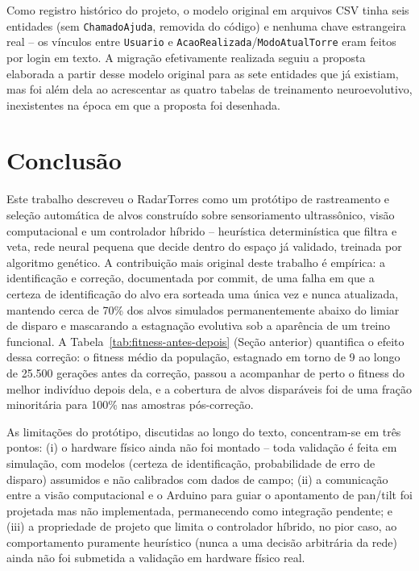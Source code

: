 \documentclass[12pt,a4paper]{article}
\begin{document}
Como registro histórico do projeto, o modelo original em arquivos CSV tinha seis entidades (sem
\texttt{ChamadoAjuda}, removida do código) e nenhuma chave estrangeira real -- os vínculos entre
\texttt{Usuario} e \texttt{AcaoRealizada}/\texttt{ModoAtualTorre} eram feitos por login em texto. A
migração efetivamente realizada seguiu a proposta elaborada a partir desse modelo original para as
sete entidades que já existiam, mas foi além dela ao acrescentar as quatro tabelas de treinamento
neuroevolutivo, inexistentes na época em que a proposta foi desenhada.

\section{Conclusão}

Este trabalho descreveu o RadarTorres como um protótipo de rastreamento e seleção automática de
alvos construído sobre sensoriamento ultrassônico, visão computacional e um controlador híbrido
-- heurística determinística que filtra e veta, rede neural pequena que decide dentro do espaço já
validado, treinada por algoritmo genético. A contribuição mais original deste trabalho é empírica:
a identificação e correção, documentada por commit, de uma falha em que a certeza de identificação
do alvo era sorteada uma única vez e nunca atualizada, mantendo cerca de 70\% dos alvos
simulados permanentemente abaixo do limiar de disparo e mascarando a estagnação evolutiva sob a
aparência de um treino funcional. A Tabela~\ref{tab:fitness-antes-depois} (Seção anterior) quantifica
o efeito dessa correção: o fitness médio da população, estagnado em torno de 9 ao longo de 25.500
gerações antes da correção, passou a acompanhar de perto o fitness do melhor indivíduo depois dela,
e a cobertura de alvos disparáveis foi de uma fração minoritária para 100\% nas amostras
pós-correção.

As limitações do protótipo, discutidas ao longo do texto, concentram-se em três pontos: (i) o
hardware físico ainda não foi montado -- toda validação é feita em simulação, com modelos
(certeza de identificação, probabilidade de erro de disparo) assumidos e não calibrados com dados
de campo; (ii) a comunicação entre a visão computacional e o Arduino para guiar o apontamento de
pan/tilt foi projetada mas não implementada, permanecendo como integração pendente; e (iii) a
propriedade de projeto que limita o controlador híbrido, no pior caso, ao comportamento puramente
heurístico (nunca a uma decisão arbitrária da rede) ainda não foi submetida a validação em hardware
físico real.
\end{document}
